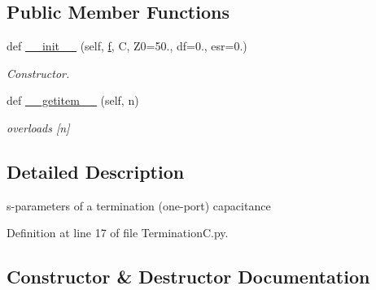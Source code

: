 \subsection*{Public Member Functions}
\begin{DoxyCompactItemize}
\item 
def \hyperlink{classSignalIntegrity_1_1SParameters_1_1Devices_1_1TerminationC_1_1TerminationC_a441cc92ccb545fe35cb1959bbef689b0}{\+\_\+\+\_\+init\+\_\+\+\_\+} (self, \hyperlink{classSignalIntegrity_1_1SParameters_1_1SParameters_1_1SParameters_a32e7a34d6837fe949b413c852a0447f8}{f}, C, Z0=50., df=0., esr=0.)
\begin{DoxyCompactList}\small\item\em Constructor. \end{DoxyCompactList}\item 
def \hyperlink{classSignalIntegrity_1_1SParameters_1_1Devices_1_1TerminationC_1_1TerminationC_ab7a6da5139e0878b590d68292aaa70f2}{\+\_\+\+\_\+getitem\+\_\+\+\_\+} (self, n)
\begin{DoxyCompactList}\small\item\em overloads \mbox{[}n\mbox{]} \end{DoxyCompactList}\end{DoxyCompactItemize}


\subsection{Detailed Description}
s-\/parameters of a termination (one-\/port) capacitance 

Definition at line 17 of file Termination\+C.\+py.



\subsection{Constructor \& Destructor Documentation}
\mbox{\label{classSignalIntegrity_1_1SParameters_1_1Devices_1_1TerminationC_1_1TerminationC_a441cc92ccb545fe35cb1959bbef689b0}} 
